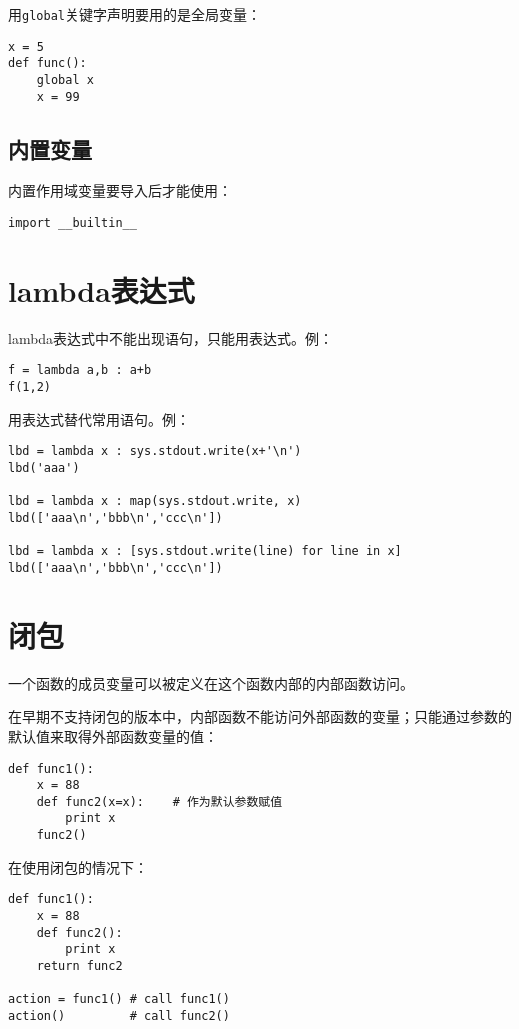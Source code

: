 用\verb|global|关键字声明要用的是全局变量：

\begin{lstlisting}
x = 5
def func():
	global x
	x = 99
\end{lstlisting}

\subsection{内置变量}

内置作用域变量要导入后才能使用：

\begin{lstlisting}
import __builtin__
\end{lstlisting}

\section{lambda表达式}

lambda表达式中不能出现语句，只能用表达式。例：

\begin{lstlisting}
f = lambda a,b : a+b
f(1,2)
\end{lstlisting}

		用表达式替代常用语句。例：

\begin{lstlisting}
lbd = lambda x : sys.stdout.write(x+'\n')
lbd('aaa')

lbd = lambda x : map(sys.stdout.write, x)
lbd(['aaa\n','bbb\n','ccc\n'])

lbd = lambda x : [sys.stdout.write(line) for line in x]
lbd(['aaa\n','bbb\n','ccc\n'])
\end{lstlisting}

	\section{闭包}

		一个函数的成员变量可以被定义在这个函数内部的内部函数访问。

		在早期不支持闭包的版本中，内部函数不能访问外部函数的变量；只能通过参数的默认值来取得外部函数变量的值：

\begin{lstlisting}
def func1():
	x = 88
	def func2(x=x):    # 作为默认参数赋值
		print x
	func2()
\end{lstlisting}

		在使用闭包的情况下：

\begin{lstlisting}
def func1():
	x = 88
	def func2():
		print x
	return func2

action = func1() # call func1()
action()         # call func2()
\end{lstlisting}

